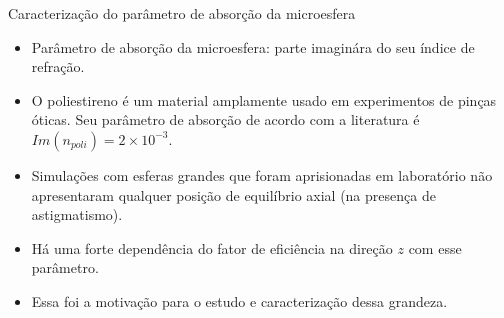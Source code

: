 \documentclass[10pt]{beamer}
\begin{document}
\begin{frame}[fragile]{Caracterização do parâmetro de absorção da microesfera} %

  \begin{center}
  \begin{itemize}
      \item Parâmetro de absorção da microesfera: parte imaginára do seu índice de refração. 

      \item O poliestireno é um material amplamente usado em experimentos de pinças óticas. Seu parâmetro de absorção de acordo com a literatura é $Im(n_{poli})=2\times10^{-3}$.

      \item Simulações com esferas grandes que foram aprisionadas em laboratório não apresentaram qualquer posição de equilíbrio axial (na presença de astigmatismo). 

      \item Há uma forte dependência do fator de eficiência na direção $z$ com esse parâmetro.

      \item Essa foi a motivação para o estudo e caracterização dessa grandeza.

  \end{itemize}
  \end{center}

\end{frame}

\end{document}
